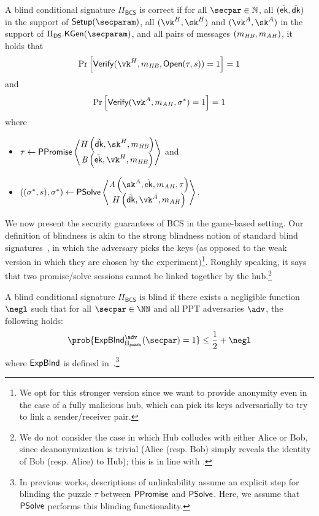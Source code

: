 \begin{definition}[Correctness]
A blind conditional signature $\Pi_\mathsf{BCS}$ is correct if for all $\secpar\in \mathbb{N}$, all $(\tilde{\mathsf{ek}}, \tilde{\mathsf{dk}})$ in the support of $\Setup(\secparam)$, all $(\vk^H, \sk^H)$ and $(\vk^A, \sk^A)$ in the support of $\Pi_\DS.\kgen(\secparam)$, and all pairs of messages $(m_{\mathit{HB}}, m_{\mathit{AH}})$, it holds that
$$
\Pr\left[\vrfy(\vk^H,m_\hb, \open(\tau, s)) = 1\right] = 1
$$
and
$$
\Pr\left[\vrfy(\vk^A,m_\ah, \sigma^*) = 1\right] = 1
$$
where 
\begin{itemize}
    \item $\tau \gets \Promise \left\langle \begin{matrix} H \left(\tilde{\dk}, \sk^H, m_\hb \right)\\ \bob \left(\tilde{\ek}, \vk^H, m_\hb\right) \end{matrix} \right\rangle$ and
    \item $((\sigma^*, s), \sigma^*) \gets \Pay \left\langle \begin{matrix} \alice \left(\sk^A,  \tilde{\ek}, m_\ah, \tau\right)\\ H \left(\tilde{\dk}, \vk^A, m_\ah\right) \end{matrix} \right\rangle$.
\end{itemize}
\end{definition}

We now present the security guarantees of BCS in the game-based setting.
Our definition of blindness is akin to the strong blindness notion of standard blind signatures~\cite{C:Chaum82}, in which the adversary picks the keys (as opposed to the weak version in which they are chosen by the experiment)\footnote{We opt for this stronger version since we want to provide anonymity even in the case of a fully malicious hub, which can pick its keys adversarially to try to link a sender/receiver pair.}. Roughly speaking, it says that two promise/solve sessions cannot be linked together by the hub.\footnote{We do not consider the case in which Hub colludes with either Alice or Bob, since deanonymization is trivial (Alice (resp. Bob) simply reveals the identity of Bob (resp. Alice) to Hub); this is in line with \cite{SP:TaiMorMaf21}.}

\begin{definition}[Blindness]
A blind conditional signature $\Pi_\mathsf{BCS}$ is blind if there exists a negligible function $\negl$ such that for all $\secpar \in \NN$ and all PPT adversaries $\adv$, the following holds:
\[ \prob{\expUnlink^{\adv}_{\Pi_{\mathsf{puzzle}}}(\secpar) = 1} \le \frac{1}{2} + \negl\]
where $\mathsf{ExpBlnd}$ is defined in~.\footnote{In previous works, descriptions of unlinkability assume an explicit step for blinding the puzzle $\tau$ between $\mathsf{PPromise}$ and $\mathsf{PSolve}$. Here, we assume that $\mathsf{PSolve}$ performs this blinding functionality.}
\end{definition}

